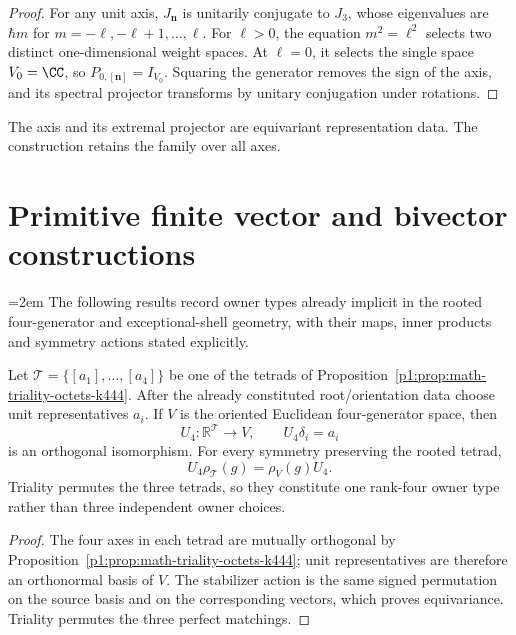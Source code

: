 \documentclass[11pt]{article}
\begin{document}
\begin{proof}
For any unit axis, \(J_{\mathbf n}\) is unitarily conjugate to \(J_3\), whose
eigenvalues are \(\hbar m\) for \(m=-\ell,-\ell+1,\ldots,\ell\).
For \(\ell>0\), the equation \(m^2=\ell^2\) selects two distinct
one-dimensional weight spaces.  At \(\ell=0\), it selects the single space
\(V_0=\CC\), so \(P_{0,[\mathbf n]}=I_{V_0}\).  Squaring the generator
removes the sign of the axis, and its spectral projector transforms by
unitary conjugation under rotations.
\end{proof}

\begin{remark}
The axis and its extremal projector are equivariant representation data.
The construction retains the family over all axes.
\end{remark}




\section{Primitive finite vector and bivector constructions}
\label{p1:sec:v558-primitive-owner-geometry}

{\emergencystretch=2em
The following results record owner types already implicit in the rooted
four-generator and exceptional-shell geometry, with their maps,
inner products and symmetry actions stated explicitly.\par}

\begin{theorem}
\label{p1:thm:v558-triality-tetrad-vector-owner}
Let \(\mathcal T=\{[a_1],\ldots,[a_4]\}\) be one of the tetrads of
Proposition~\ref{p1:prop:math-triality-octets-k444}.  After the already
constituted root/orientation data choose unit representatives \(a_i\).  If
\(V\) is the oriented Euclidean four-generator space, then
\[
 U_4:\mathbb R^{\mathcal T}\longrightarrow V,
 \qquad U_4\delta_i=a_i
\]
is an orthogonal isomorphism.  For every symmetry preserving the rooted
tetrad,
\[
 U_4\rho_{\mathcal T}(g)=\rho_V(g)U_4.
\]
Triality permutes the three tetrads, so they constitute one rank-four owner
type rather than three independent owner choices.
\end{theorem}
\begin{proof}
The four axes in each tetrad are mutually orthogonal by
Proposition~\ref{p1:prop:math-triality-octets-k444}; unit representatives are
therefore an orthonormal basis of \(V\).  The stabilizer action is the same
signed permutation on the source basis and on the corresponding vectors,
which proves equivariance.  Triality permutes the three perfect matchings.
\end{proof}
\end{document}

